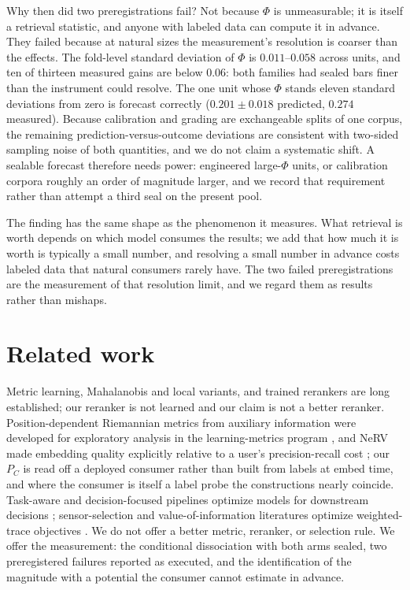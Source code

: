 \documentclass{article}
\begin{document}
Why then did two preregistrations fail? Not because $\Phi$ is
unmeasurable; it is itself a retrieval statistic, and anyone with labeled
data can compute it in advance. They failed because at natural sizes the
measurement's resolution is coarser than the effects. The fold-level
standard deviation of $\Phi$ is $0.011$--$0.058$ across units, and ten of
thirteen measured gains are below $0.06$: both families had sealed bars
finer than the instrument could resolve. The one unit whose $\Phi$ stands
eleven standard deviations from zero is forecast correctly
($0.201\pm0.018$ predicted, $0.274$ measured). Because calibration and
grading are exchangeable splits of one corpus, the remaining
prediction-versus-outcome deviations are consistent with two-sided sampling
noise of both quantities, and we do not claim a systematic shift. A
sealable forecast therefore needs power: engineered large-$\Phi$ units, or
calibration corpora roughly an order of magnitude larger, and we record
that requirement rather than attempt a third seal on the present pool.

The finding has the same shape as the phenomenon it measures. What
retrieval is worth depends on which model consumes the results; we add that
how much it is worth is typically a small number, and resolving a small
number in advance costs labeled data that natural consumers rarely have.
The two failed preregistrations are the measurement of that resolution
limit, and we regard them as results rather than mishaps.

\section{Related work}

Metric learning, Mahalanobis and local variants, and trained rerankers are
long established; our reranker is not learned and our claim is not a better
reranker. Position-dependent Riemannian metrics from auxiliary information
were developed for exploratory analysis in the learning-metrics program
\citep{kaski2001,peltonen2004}, and NeRV made embedding quality explicitly
relative to a user's precision-recall cost \citep{venna2010}; our $P_C$ is
read off a deployed consumer rather than built from labels at embed time,
and where the consumer is itself a label probe the constructions nearly
coincide. Task-aware and decision-focused pipelines optimize models for
downstream decisions \citep{elmachtoub2022}; sensor-selection and
value-of-information literatures optimize weighted-trace objectives
\citep{joshiboyd2009}. We do not offer a better metric, reranker, or
selection rule. We offer the measurement: the conditional dissociation with
both arms sealed, two preregistered failures reported as executed, and the
identification of the magnitude with a potential the consumer cannot
estimate in advance.
\end{document}
